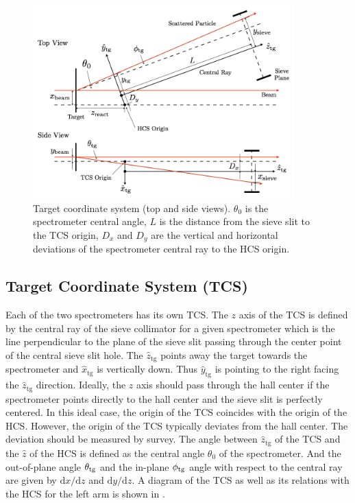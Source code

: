 \begin{figure}[p!]
  \centering
  \includegraphics[width=0.9\textwidth]{figs/TCS.png}
  \caption[Target coordinate system.]{Target coordinate system (top and side views). $\theta_0$ is the spectrometer central angle, $L$ is the distance from the sieve slit to the TCS origin, $D_x$ and $D_y$ are the vertical and horizontal deviations of the spectrometer central ray to the HCS origin. \label{C6S1F2}}
\end{figure}

\subsection[Target Coordinate System]{Target Coordinate System (TCS)}
\label{C6S1SS2}

Each of the two spectrometers has its own TCS. The $z$ axis of the TCS is defined by the central ray of the sieve collimator for a given spectrometer which is the line perpendicular to the plane of the sieve slit passing through the center point of the central sieve slit hole. The $\hat{z}_{\mathrm{tg}}$ points away the target towards the spectrometer and $\hat{x}_{\mathrm{tg}}$ is vertically down. Thus $\hat{y}_{\mathrm{tg}}$ is pointing to the right facing the $\hat{z}_{\mathrm{tg}}$ direction. Ideally, the $z$ axis should pass through the hall center if the spectrometer points directly to the hall center and the sieve slit is perfectly centered. In this ideal case, the origin of the TCS coincides with the origin of the HCS. However, the origin of the TCS typically deviates from the hall center. The deviation should be measured by survey. The angle between $\hat{z}_{\mathrm{tg}}$ of the TCS and the $\hat{z}$ of the HCS is defined as the central angle $\theta_0$ of the spectrometer. And the out-of-plane angle $\theta_{\mathrm{tg}}$ and the in-plane $\phi_{\mathrm{tg}}$ angle with respect to the central ray are given by $\mathrm{d}x/\mathrm{d}z$ and $\mathrm{d}y/\mathrm{d}z$. A diagram of the TCS as well as its relations with the HCS for the left arm is shown in .

